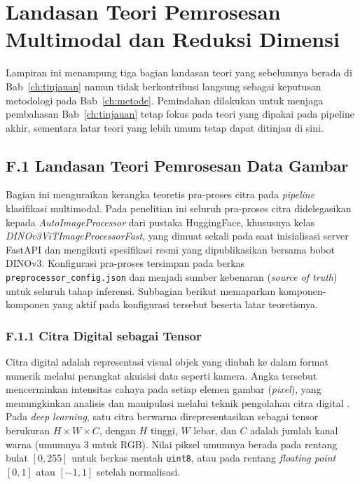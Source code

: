 \chapter{Landasan Teori Pemrosesan Multimodal dan Reduksi Dimensi}
\label{app:teori-multimodal}

Lampiran ini menampung tiga bagian landasan teori yang sebelumnya berada di Bab~\ref{ch:tinjauan} namun tidak berkontribusi langsung sebagai keputusan metodologi pada Bab~\ref{ch:metode}. Pemindahan dilakukan untuk menjaga pembahasan Bab~\ref{ch:tinjauan} tetap fokus pada teori yang dipakai pada pipeline akhir, sementara latar teori yang lebih umum tetap dapat ditinjau di sini.

\section*{F.1 Landasan Teori Pemrosesan Data Gambar}
\label{app:imgproc-detail}

Bagian ini menguraikan kerangka teoretis pra-proses citra pada \textit{pipeline} klasifikasi multimodal. Pada penelitian ini seluruh pra-proses citra didelegasikan kepada \textit{AutoImageProcessor} dari pustaka HuggingFace, khususnya kelas \textit{DINOv3ViTImageProcessorFast}, yang dimuat sekali pada saat inisialisasi server FastAPI dan mengikuti spesifikasi resmi yang dipublikasikan bersama bobot DINOv3. Konfigurasi pra-proses tersimpan pada berkas \texttt{preprocessor\_config.json} dan menjadi sumber kebenaran (\textit{source of truth}) untuk seluruh tahap inferensi. Subbagian berikut memaparkan komponen-komponen yang aktif pada konfigurasi tersebut beserta latar teoretisnya.

\subsection*{F.1.1 Citra Digital sebagai Tensor}

Citra digital adalah representasi visual objek yang diubah ke dalam format numerik melalui perangkat akuisisi data seperti kamera. Angka tersebut mencerminkan intensitas cahaya pada setiap elemen gambar (\textit{pixel}), yang memungkinkan analisis dan manipulasi melalui teknik pengolahan citra digital \citep{article}. Pada \textit{deep learning}, satu citra berwarna direpresentasikan sebagai tensor berukuran $H \times W \times C$, dengan $H$ tinggi, $W$ lebar, dan $C$ adalah jumlah kanal warna (umumnya 3 untuk RGB). Nilai piksel umumnya berada pada rentang bulat $[0, 255]$ untuk berkas mentah \texttt{uint8}, atau pada rentang \textit{floating point} $[0, 1]$ atau $[-1, 1]$ setelah normalisasi.


